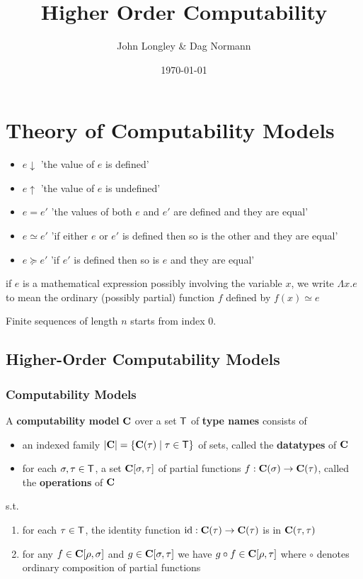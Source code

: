 \documentclass[11pt]{article}
\author{John Longley \& Dag Normann}
\date{\today}
\title{Higher Order Computability}
\begin{document}
\maketitle
\tableofcontents


\section{Theory of Computability Models}
\label{sec:orgf06d3d9}
\begin{itemize}
\item \(e\downarrow\) 'the value of \(e\) is defined'
\item \(e\uparrow\) 'the value of \(e\) is undefined'
\item \(e=e'\) 'the values of both \(e\) and \(e'\) are defined and they are equal'
\item \(e\simeq e'\) 'if either \(e\) or \(e'\) is defined then so is the other and they are equal'
\item \(e\succeq e'\) 'if \(e'\) is defined then so is \(e\) and they are equal'
\end{itemize}


if \(e\) is a mathematical expression possibly involving the variable \(x\), we write \(\Lambda x.e\)
to mean the ordinary (possibly partial) function \(f\) defined by \(f(x)\simeq e\)

Finite sequences of length \(n\) starts from index 0.
\subsection{Higher-Order Computability Models}
\label{sec:org94e3ad1}
\subsubsection{Computability Models}
\label{sec:org5e9c12b}
\begin{definition}[]
\label{3.1.1}
A \textbf{computability model} \(\operatorname{\textbf{C}}\)  over a set \(\textsf{T}\) of \textbf{type names} consists of
\begin{itemize}
\item an indexed family \(\abs{\bC}=\{\bC(\tau)\mid\tau\in\sfT\}\) of sets, called the \textbf{datatypes} of \(\operatorname{\textbf{C}}\)
\item for each \(\sigma,\tau\in\textsf{T}\), a set \(\operatorname{\textbf{C}}[\sigma,\tau]\) of partial functions \(f:\operatorname{\textbf{C}}(\sigma)\to\operatorname{\textbf{C}}(\tau)\), called the
\textbf{operations} of \(\operatorname{\textbf{C}}\)
\end{itemize}


s.t.
\begin{enumerate}
\item for each \(\tau\in\textsf{T}\), the identity function \(\operatorname{id}:\operatorname{\textbf{C}}(\tau)\to\operatorname{\textbf{C}}(\tau)\) is in \(\operatorname{\textbf{C}}(\tau,\tau)\)
\item for any \(f\in\operatorname{\textbf{C}}[\rho,\sigma]\) and \(g\in\operatorname{\textbf{C}}[\sigma,\tau]\) we have \(g\circ f\in\operatorname{\textbf{C}}[\rho,\tau]\) where \(\circ\) denotes ordinary
composition of partial functions
\end{enumerate}
\end{definition}
\end{document}
